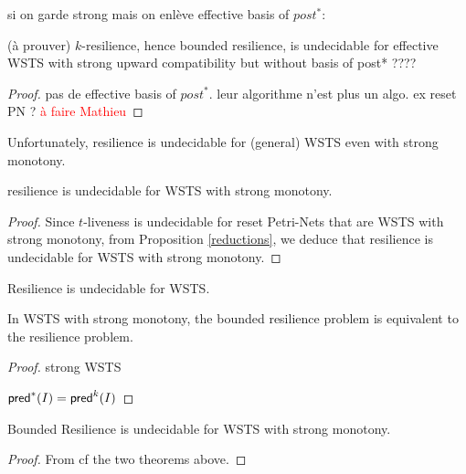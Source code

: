 si on garde strong mais on enlève effective basis of $post^*$:

\begin{proposition}(à prouver)
{\sc $k$-resilience}, hence {\sc bounded resilience}, is undecidable for effective WSTS with strong upward compatibility but without basis of post* ????
\end{proposition}

\begin{proof}
pas de effective basis of $post^*$. leur algorithme n'est plus un algo. ex reset PN ?  \textcolor{red}{à faire Mathieu}
\end{proof}


Unfortunately, resilience is undecidable for (general) WSTS even with strong monotony.

\begin{theorem}
{\sc resilience} is undecidable for WSTS with strong monotony.
\end{theorem}


\begin{proof} 

Since $t$-liveness is undecidable for reset Petri-Nets that are WSTS with strong monotony, from Proposition \ref{reductions}, we deduce that resilience is undecidable for WSTS with strong monotony.
  
\end{proof}


\begin{corollary}
{\sc Resilience} is undecidable for WSTS.
\end{corollary}

\begin{theorem}
In WSTS with strong monotony, 
the {\sc bounded resilience} problem
is equivalent to the
{\sc resilience} problem.
\end{theorem}

\begin{proof}
strong WSTS

$\textsf{pred}^*(I) = \textsf{pred}^{k}(I)$

\end{proof}

\begin{corollary}
Bounded Resilience is undecidable for WSTS with strong monotony.
\end{corollary}

\begin{proof} 
  From
  cf
the two  theorems above. 
\end{proof}



